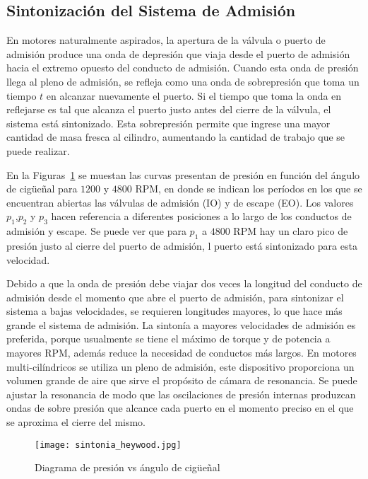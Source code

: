 \subsection{Sintonización del Sistema de Admisión}
%
En motores naturalmente aspirados, la apertura de la válvula o puerto de
admisión produce una onda de depresión que viaja desde el puerto de admisión
hacia el extremo opuesto del conducto de admisión.
%
Cuando esta onda de presión llega al pleno de admisión, se refleja como una
onda de sobrepresión que toma un tiempo $t$ en alcanzar nuevamente el puerto.
%
Si el tiempo que toma la onda en reflejarse es tal que alcanza el puerto justo
antes del cierre de la válvula, el sistema está sintonizado.
%
Esta sobrepresión permite que ingrese una mayor cantidad de masa fresca al
cilindro, aumentando la cantidad de trabajo que se puede realizar.

En la Figuras~\ref{fig:sintonia_heywood} se muestan las curvas presentan  de
presión en función del ángulo de cigüeñal para $1200$ y $4800$ RPM, en donde se
indican los períodos en los que se encuentran abiertas las válvulas de admisión
(IO) y de escape (EO).
%
Los valores $p_{1}$,$p_{2}$ y $p_{3}$ hacen referencia a diferentes posiciones
a lo largo de los conductos de admisión y escape.
%
Se puede ver que para $p_{1}$ a $4800$ RPM hay un claro pico de presión justo al
cierre del puerto de admisión, l puerto está sintonizado para esta velocidad.

Debido a que la onda de presión debe viajar dos veces la longitud del conducto
de admisión desde el momento que abre el puerto de admisión, para sintonizar el
sistema a bajas velocidades, se requieren longitudes mayores, lo que hace más
grande el sistema de admisión.
%
La sintonía a mayores velocidades de admisión es preferida, porque usualmente se
tiene el máximo de torque y de potencia a mayores RPM, además reduce la
necesidad de conductos más largos.
%
En motores multi-cilíndricos se utiliza un pleno de admisión, este dispositivo
proporciona un volumen grande de aire que sirve el propósito de cámara de
resonancia.
%
Se puede ajustar la resonancia de modo que las oscilaciones de presión internas
produzcan ondas de sobre presión que alcance cada puerto en el momento preciso
en el que se aproxima el cierre del mismo.

\begin{figure} \centering
\texttt{[image: sintonia\_heywood.jpg]}
    \caption{Diagrama de presión vs ángulo de cigüeñal~\parencite{heywood}}\label{fig:sintonia_heywood}
\end{figure}

